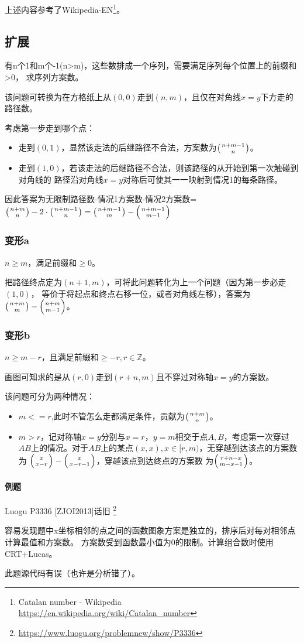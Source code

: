 上述内容参考了Wikipedia-EN\footnote{Catalan number - Wikipedia
	\url{https://en.wikipedia.org/wiki/Catalan\_number}}。
\subsection{扩展}
有n个1和m个-1(n>m)，这些数排成一个序列，需要满足序列每个位置上的前缀和>0，
求序列方案数。

该问题可转换为在方格纸上从$(0,0)$走到$(n,m)$，且仅在对角线$x=y$下方走的路径数。

考虑第一步走到哪个点：
\begin{itemize}
	\item 走到$(0,1)$，显然该走法的后继路径不合法，方案数为$\left(n+m-1 \atop n\right)$。
	\item 走到$(1,0)$，若该走法的后继路径不合法，则该路径的从开始到第一次触碰到对角线的
	路径沿对角线$x=y$对称后可使其一一映射到情况1的每条路径。
\end{itemize}

因此答案为无限制路径数-情况1方案数-情况2方案数=$\left(n+m \atop n\right)-
2\cdot\left(n+m-1 \atop n\right)=\left(n+m-1 \atop m\right)-\left(n+m-1 \atop m-1\right)$
\subsubsection{变形a}
$n\geq m$，满足前缀和$\geq 0$。

把路径终点定为$(n+1,m)$，可将此问题转化为上一个问题（因为第一步必走$(1,0)$，
等价于将起点和终点右移一位，或者对角线左移），答案为
$\left(n+m \atop m\right)-\left(n+m \atop m-1\right)$。
\subsubsection{变形b}
$n\geq m-r$，且满足前缀和$\geq -r,r\in \mathbb{Z}$。

画图可知求的是从$(r,0)$走到$(r+n,m)$且不穿过对称轴$x=y$的方案数。

该问题可分为两种情况：
\begin{itemize}
	\item $m<=r$,此时不管怎么走都满足条件，贡献为$\left(n+m \atop n\right)$。
	\item $m>r$，记对称轴$x=y$分别与$x=r$，$y=m$相交于点$A,B$，考虑第一次穿过
	$AB$上的情况。对于$AB$上的某点$(x,x),x\in [r,m)$，无穿越到达该点的方案数为
	$\left(x \atop x-r\right)-\left(x \atop x-r-1\right)$，穿越该点到达终点的方案数
	为$\left(r+n-x \atop m-x-1\right)$。
\end{itemize}

\paragraph{例题}
Luogu P3336 [ZJOI2013]话旧
\footnote{\url{https://www.luogu.org/problemnew/show/P3336}}

容易发现题中x坐标相邻的点之间的函数图象方案是独立的，排序后对每对相邻点计算最值和方案数。
方案数受到函数最小值为0的限制。计算组合数时使用CRT+Lucas。

此题源代码有误（也许是分析错了）。


